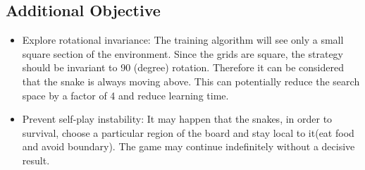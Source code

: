 \documentclass[conference]{IEEEtran}
\begin{document}
\subsection{Additional Objective}
\begin{itemize}
	\item{Explore rotational invariance: The training algorithm will see only a
  small square section of the environment. Since the grids are square, the
  strategy should be invariant to 90 (degree) rotation. Therefore it can be
  considered that the snake is always moving above. This can potentially
  reduce the search space by a factor of 4 and reduce learning time.}
	\item{Prevent self-play instability: It may happen that the snakes, in
  order to survival, choose a particular region of the board and stay local
  to it(eat food and avoid boundary). The game may continue indefinitely
  without a decisive result. }
\end{itemize}
\section*{}
\end{document}
